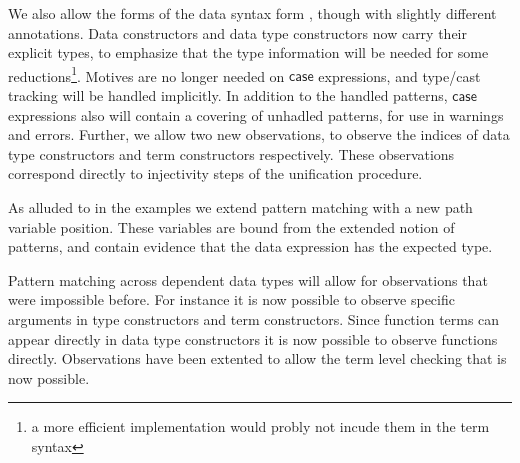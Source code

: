 We also allow the forms of the data syntax form , though with slightly different annotations.
Data constructors and data type constructors now carry their explicit types, to emphasize that the type information will be needed for some reductions\footnote{
  a more efficient implementation would probly not incude them in the term syntax}.
Motives are no longer needed on $\mathsf{case}$ expressions, and type/cast tracking will be handled implicitly.
In addition to the handled patterns, $\mathsf{case}$ expressions also will contain a covering of unhadled patterns, for use in warnings and errors.
Further, we allow two new observations, to observe the indices of data type constructors and term constructors respectively.
These observations correspond directly to injectivity steps of the unification procedure.
 
As alluded to in the examples we extend pattern matching with a new path variable position.
These variables are bound from the extended notion of patterns, and contain evidence that the data expression has the expected type.

Pattern matching across dependent data types will allow for observations that were impossible before.
For instance it is now possible to observe specific arguments in type constructors and term constructors.
Since function terms can appear directly in data type constructors it is now possible to observe functions directly.
Observations have been extented to allow the term level checking that is now possible.



